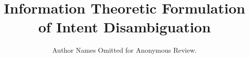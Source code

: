 \documentclass[conference]{IEEEtran}
\begin{document}
\title{Information Theoretic Formulation of Intent Disambiguation}
\author{Author Names Omitted for Anonymous Review.}




% 
%	
%	
%	
%	

\maketitle
\end{document}

